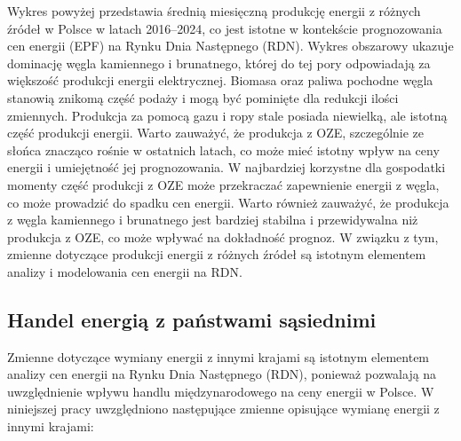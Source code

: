 Wykres powyżej przedstawia średnią miesięczną produkcję energii z różnych źródeł w Polsce w latach 2016–2024, co jest istotne w kontekście prognozowania cen energii (EPF) na Rynku Dnia Następnego (RDN). Wykres obszarowy ukazuje dominację węgla kamiennego i brunatnego, której do tej pory odpowiadają za większość produkcji energii elektrycznej. Biomasa oraz paliwa pochodne węgla stanowią znikomą część podaży i mogą być pominięte dla redukcji ilości zmiennych. Produkcja za pomocą gazu i ropy stale posiada niewielką, ale istotną część produkcji energii. Warto zauważyć, że produkcja z OZE, szczególnie ze słońca znacząco rośnie w ostatnich latach, co może mieć istotny wpływ na ceny energii i umiejętność jej prognozowania. W najbardziej korzystne dla gospodatki momenty część produkcji z OZE może przekraczać zapewnienie energii z węgla, co może prowadzić do spadku cen energii. Warto również zauważyć, że produkcja z węgla kamiennego i brunatnego jest bardziej stabilna i przewidywalna niż produkcja z OZE, co może wpływać na dokładność prognoz. W związku z tym, zmienne dotyczące produkcji energii z różnych źródeł są istotnym elementem analizy i modelowania cen energii na RDN.

\subsection{Handel energią z państwami sąsiednimi}
Zmienne dotyczące wymiany energii z innymi krajami są istotnym elementem analizy cen energii na Rynku Dnia Następnego (RDN), ponieważ pozwalają na uwzględnienie wpływu handlu międzynarodowego na ceny energii w Polsce. W niniejszej pracy uwzględniono następujące zmienne opisujące wymianę energii z innymi krajami:

